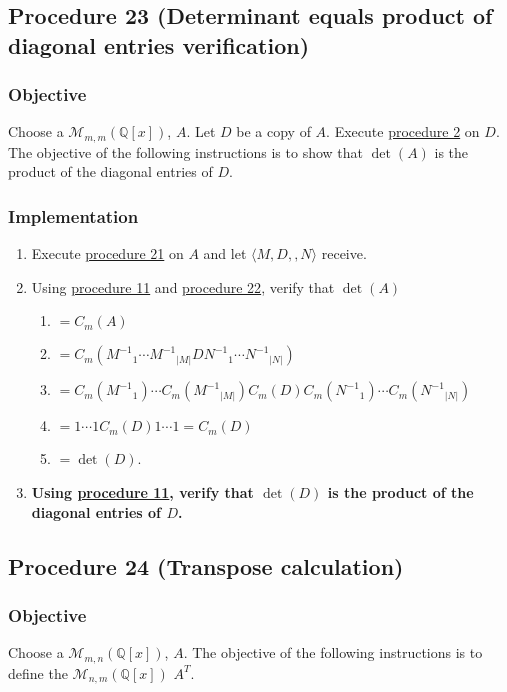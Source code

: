 \documentclass[twocolumn]{article}
\begin{document}
		\subsection{Procedure 23 (Determinant equals product of diagonal entries verification)}\label{sec:procedure 23}
			\subsubsection{Objective}
				Choose a $\mathcal{M}_{m,m}(\mathbb{Q}[x])$, $A$. Let $D$ be a copy of $A$. Execute \hyperref[sec:procedure 2]{procedure 2} on $D$. The objective of the following instructions is to show that $\det(A)$ is the product of the diagonal entries of $D$.
			\subsubsection{Implementation}
				\begin{enumerate}
					\item Execute \hyperref[sec:procedure 21]{procedure 21} on $A$ and let $\langle M,D,,N\rangle$ receive.
					\item Using \hyperref[sec:procedure 11]{procedure 11} and \hyperref[sec:procedure 22]{procedure 22}, verify that $\det(A)$
					\begin{enumerate}
						\item $=C_m(A)$
						\item $=C_m({M^{-1}}_1\cdots {M^{-1}}_{\lvert M\rvert}D{N^{-1}}_1\cdots {N^{-1}}_{\lvert N\rvert})$
						\item $=C_m({M^{-1}}_1)\cdots C_m({M^{-1}}_{\lvert M\rvert})C_m(D)C_m({N^{-1}}_1)\cdots\allowbreak C_m({N^{-1}}_{\lvert N\rvert})$
						\item $=1\cdots 1C_m(D)1\cdots 1=C_m(D)$
						\item $=\det(D)$.
					\end{enumerate}
					\item \textbf{Using \hyperref[sec:procedure 11]{procedure 11}, verify that $\det(D)$ is the product of the diagonal entries of $D$.}
				\end{enumerate}
		\subsection{Procedure 24 (Transpose calculation)}\label{sec:procedure 24}
			\subsubsection{Objective}
				Choose a $\mathcal{M}_{m,n}(\mathbb{Q}[x])$, $A$. The objective of the following instructions is to define the $\mathcal{M}_{n,m}(\mathbb{Q}[x])$ $A^T$.
\end{document}
